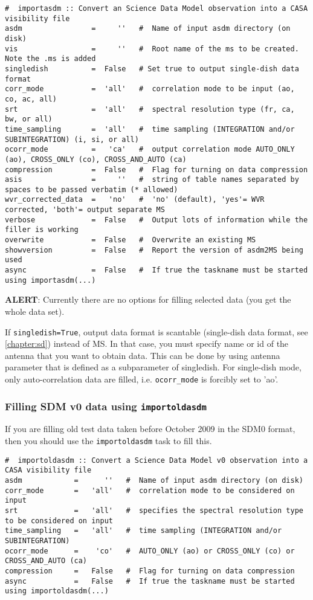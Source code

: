 \small
\begin{verbatim}
#  importasdm :: Convert an Science Data Model observation into a CASA visibility file
asdm                =     ''   #  Name of input asdm directory (on disk)
vis                 =     ''   #  Root name of the ms to be created. Note the .ms is added
singledish          =  False   # Set true to output single-dish data format 
corr_mode           =  'all'   #  correlation mode to be input (ao, co, ac, all)
srt                 =  'all'   #  spectral resolution type (fr, ca, bw, or all)
time_sampling       =  'all'   #  time sampling (INTEGRATION and/or SUBINTEGRATION) (i, si, or all)
ocorr_mode          =   'ca'   #  output correlation mode AUTO_ONLY (ao), CROSS_ONLY (co), CROSS_AND_AUTO (ca)
compression         =  False   #  Flag for turning on data compression
asis                =     ''   #  string of table names separated by spaces to be passed verbatim (* allowed)
wvr_corrected_data  =   'no'   #  'no' (default), 'yes'= WVR corrected, 'both'= output separate MS
verbose             =  False   #  Output lots of information while the filler is working
overwrite           =  False   #  Overwrite an existing MS
showversion         =  False   #  Report the version of asdm2MS being used
async               =  False   #  If true the taskname must be started using importasdm(...)
\end{verbatim}
\normalsize

{\bf ALERT}: Currently there are no options for filling selected data
(you get the whole data set).  

If {\tt singledish=True}, output data format is scantable (single-dish data
format, see \ref{chapter:sd}) instead of MS. In that case, you must specify
name or id of the antenna that you want to obtain data. This can be
done by using antenna parameter that is defined as a subparameter of
singledish. For single-dish mode, only auto-correlation data are
filled, i.e. {\tt ocorr\_mode} is forcibly set to 'ao'. 

\subsubsection{Filling SDM v0 data using {\tt importoldasdm}}
\label{section:io.import.asdm.old}

If you are filling old test data taken
before October 2009 in the SDM0 format, then you should use the 
{\tt importoldasdm} task to fill this.
\small
\begin{verbatim}
#  importoldasdm :: Convert a Science Data Model v0 observation into a CASA visibility file
asdm            =      ''   #  Name of input asdm directory (on disk)
corr_mode       =   'all'   #  correlation mode to be considered on input
srt             =   'all'   #  specifies the spectral resolution type to be considered on input
time_sampling   =   'all'   #  time sampling (INTEGRATION and/or SUBINTEGRATION)
ocorr_mode      =    'co'   #  AUTO_ONLY (ao) or CROSS_ONLY (co) or CROSS_AND_AUTO (ca)
compression     =   False   #  Flag for turning on data compression
async           =   False   #  If true the taskname must be started using importoldasdm(...)
\end{verbatim}
\normalsize

